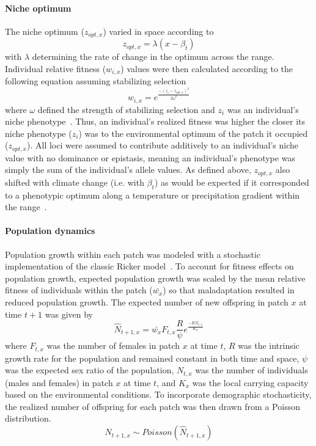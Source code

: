 \documentclass[11pt]{article}
\begin{document}
\paragraph{Niche optimum}
The niche optimum ($z_{opt,x}$) varied in space according to
\begin{equation}
z_{opt,x}=\lambda(x-\beta_{t})
\end{equation}
with $\lambda$ determining the rate of change in the optimum across the range. Individual relative fitness ($w_{i,x}$) values were then calculated according to the following equation assuming stabilizing selection
\begin{equation}
w_{i,x}=e^{\frac{-(z_{i}-z_{opt,x})^{2}}{2\omega^{2}}}
\end{equation}
where $\omega$ defined the strength of stabilizing selection and $z_{i}$ was an individual's niche phenotype~\citep{lande1976natural}. Thus, an individual's realized fitness was higher the closer its niche phenotype ($z_{i}$) was to the environmental optimum of the patch it occupied ($z_{opt,x}$). All loci were assumed to contribute additively to an individual's niche value with no dominance or epistasis, meaning an individual's phenotype was simply the sum of the individual's allele values. As defined above, $z_{opt,x}$ also shifted with climate change (i.e. with $\beta_{t}$) as would be expected if it corresponded to a phenotypic optimum along a temperature or precipitation gradient within the range~\citep{davis2001range}. 

\paragraph{Population dynamics}
Population growth within each patch was modeled with a stochastic implementation of the classic Ricker model~\citep{ricker1954stock, melbourne2008extinction}. To account for fitness effects on population growth, expected population growth was scaled by the mean relative fitness of individuals within the patch ($\bar{w_{x}}$) so that maladaptation resulted in reduced population growth. The expected number of new offspring in patch $x$ at time $t+1$ was given by
\begin{equation}
\hat{N}_{t+1,x}=\bar{w_{x}}F_{t,x}\frac{R}{\psi}e^{\frac{-RN_{t,x}}{K_{x}}}
\end{equation}
where $F_{t,x}$ was the number of females in patch $x$ at time $t$, $R$ was the intrinsic growth rate for the population and remained constant in both time and space, $\psi$ was the expected sex ratio of the population, $N_{t,x}$ was the number of individuals (males and females) in patch $x$ at time $t$, and $K_{x}$ was the local carrying capacity based on the environmental conditions. To incorporate demographic stochasticity, the realized number of offspring for each patch was then drawn from a Poisson distribution.
\begin{equation}
N_{t+1,x}\sim Poisson(\hat{N}_{t+1,x})
\end{equation}
\end{document}
